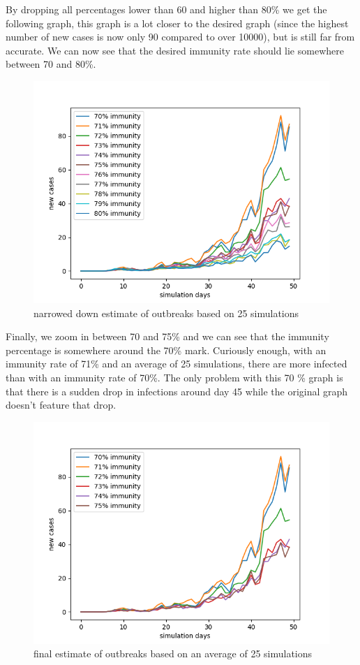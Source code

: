 \documentclass[runningheads]{llncs}
\begin{document}
	\newpage
	\noindent
	By dropping all percentages lower than 60 and higher than 80\% we get the following graph, this graph is a lot closer to the desired graph (since the highest number of new cases is now only 90 compared to over 10000), but is still far from accurate. We can now see that the desired immunity rate should lie somewhere between 70 and 80\%.	
	\begin{figure}
		\includegraphics[width=\textwidth]{test_immunity_70-80.png}
		\caption{narrowed down estimate of outbreaks based on 25 simulations}
	\end{figure}
	
	\newpage
	\noindent
	Finally, we zoom in between 70 and 75\% and we can see that the immunity percentage is somewhere around the 70\% mark. Curiously enough, with an immunity rate of 71\% and an average of 25 simulations, there are more infected than with an immunity rate of 70\%. The only problem with this 70 \% graph is that there is a sudden drop in infections around day 45 while the original graph doesn't feature that drop.
	\begin{figure}
		\includegraphics[width=\textwidth]{test_immunity_70-75.png}
		\caption{final estimate of outbreaks based on an average of 25 simulations}
	\end{figure}
	\newpage
	
\end{document}
